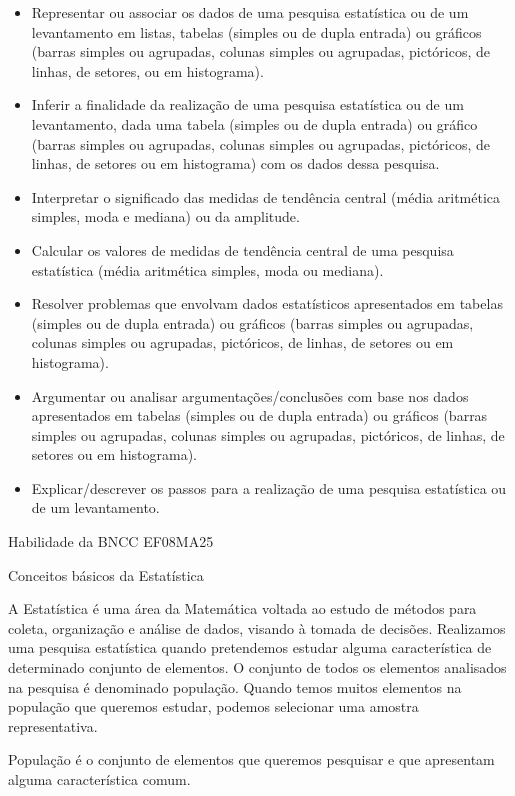 {\begin{itemize}
\item
  Representar ou associar os dados de uma pesquisa estatística ou de um
  levantamento em listas, tabelas (simples ou de dupla entrada) ou
  gráficos (barras simples ou agrupadas, colunas simples ou agrupadas,
  pictóricos, de linhas, de setores, ou em histograma).
\item
  Inferir a finalidade da realização de uma pesquisa estatística ou de
  um levantamento, dada uma tabela (simples ou de dupla entrada) ou
  gráfico (barras simples ou agrupadas, colunas simples ou agrupadas,
  pictóricos, de linhas, de setores ou em histograma) com os dados dessa
  pesquisa.
\item
  Interpretar o significado das medidas de tendência central (média
  aritmética simples, moda e mediana) ou da amplitude.
\item
  Calcular os valores de medidas de tendência central de uma pesquisa
  estatística (média aritmética simples, moda ou mediana).
\item
  Resolver problemas que envolvam dados estatísticos apresentados em
  tabelas (simples ou de dupla entrada) ou gráficos (barras simples ou
  agrupadas, colunas simples ou agrupadas, pictóricos, de linhas, de
  setores ou em histograma).
\item
  Argumentar ou analisar argumentações/conclusões com base nos dados
  apresentados em tabelas (simples ou de dupla entrada) ou gráficos
  (barras simples ou agrupadas, colunas simples ou agrupadas,
  pictóricos, de linhas, de setores ou em histograma).
\item
  Explicar/descrever os passos para a realização de uma pesquisa
  estatística ou de um levantamento.
\end{itemize}

Habilidade da BNCC EF08MA25

Conceitos básicos da Estatística

A Estatística é uma área da Matemática voltada ao estudo de métodos para
coleta, organização e análise de dados, visando à tomada de decisões.
Realizamos uma pesquisa estatística quando pretendemos estudar alguma
característica de determinado conjunto de elementos. O conjunto de todos
os elementos analisados na pesquisa é denominado população. Quando temos
muitos elementos na população que queremos estudar, podemos selecionar
uma amostra representativa.

População é o conjunto de elementos que queremos pesquisar e que
apresentam alguma característica comum.

}
